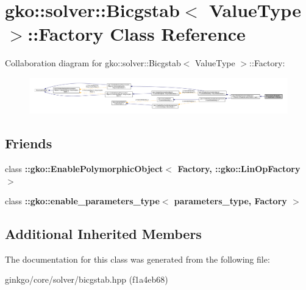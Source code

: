 \hypertarget{classgko_1_1solver_1_1Bicgstab_1_1Factory}{}\section{gko\+:\+:solver\+:\+:Bicgstab$<$ Value\+Type $>$\+:\+:Factory Class Reference}
\label{classgko_1_1solver_1_1Bicgstab_1_1Factory}


Collaboration diagram for gko\+:\+:solver\+:\+:Bicgstab$<$ Value\+Type $>$\+:\+:Factory\+:
\nopagebreak
\begin{figure}[H]
\begin{center}
\leavevmode
\includegraphics[width=350pt]{classgko_1_1solver_1_1Bicgstab_1_1Factory__coll__graph}
\end{center}
\end{figure}
\subsection*{Friends}
\begin{DoxyCompactItemize}
\item 
\mbox{\label{classgko_1_1solver_1_1Bicgstab_1_1Factory_a27e9bbc94a1c1c59f40833153eda8f78}} 
class {\bfseries \+::gko\+::\+Enable\+Polymorphic\+Object$<$ Factory, \+::gko\+::\+Lin\+Op\+Factory $>$}
\item 
\mbox{\label{classgko_1_1solver_1_1Bicgstab_1_1Factory_a0d176cbd42d6214e11aee8c30ca256fc}} 
class {\bfseries \+::gko\+::enable\+\_\+parameters\+\_\+type$<$ parameters\+\_\+type, Factory $>$}
\end{DoxyCompactItemize}
\subsection*{Additional Inherited Members}


The documentation for this class was generated from the following file\+:\begin{DoxyCompactItemize}
\item 
ginkgo/core/solver/bicgstab.\+hpp (f1a4eb68)\end{DoxyCompactItemize}
